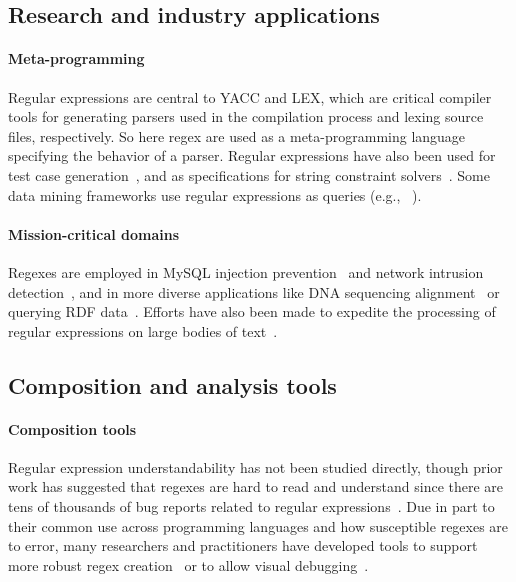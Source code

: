 \subsection{Research and industry applications}
\paragraph{Meta-programming}  Regular expressions are central to YACC and LEX, which are critical compiler tools for generating parsers used in the compilation process and lexing source files, respectively.  So here regex are used as a meta-programming language specifying the behavior of a parser.  Regular expressions have also been used for test case generation~\cite{Ghosh:2013:JAT:2486788.2486925, Galler:2014:STD:2683035.2683100, Anand:2013:OSM:2503903.2503991, Tillmann:2014:TAT:2642937.2642941},  and as specifications for string constraint solvers~\cite{Trinh:2014:SSS:2660267.2660372, hampi}.  Some data mining frameworks use regular expressions as queries (e.g., ~\cite{Begel:2010:CDE:1806799.1806821}).

\paragraph{Mission-critical domains}  Regexes are employed in MySQL injection prevention~\cite{Yeole:2011:ADT:1980022.1980229} and network intrusion detection~\cite{network}, and in more diverse applications like DNA sequencing alignment~\cite{1594922} or querying RDF data~\cite{Lee:2010:PSQ:1871871.1871877, Alkhateeb:2009:ESR:1540656.1540975}.  Efforts have also been made to expedite the processing of regular expressions on large bodies of text~\cite{Baeza-Yates:1996:FTS:235809.235810}.

\subsection{Composition and analysis tools}

\paragraph{Composition tools} Regular expression understandability has not been studied directly, though prior work has suggested that regexes are hard to read and understand since there are tens of thousands of bug reports related to regular expressions~\cite{Spishak:2012:TSR:2318202.2318207}.  Due in part to their common use across programming languages and how susceptible regexes are to error, many researchers and practitioners have developed tools to support more robust regex creation~\cite{Spishak:2012:TSR:2318202.2318207} or to allow visual debugging~\cite{Beck:2014:RVD:2591062.2591111}.

